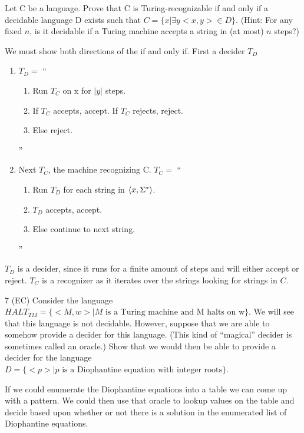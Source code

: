 \begin{problem}{6}
  Let C be a language. Prove that C is Turing-recognizable if and only if a decidable language D exists such that $C =
  \{x | \exists y <x,y> \in D\}$. (Hint: For any fixed $n$, is it decidable if a Turing machine accepts a string in (at
  most) $n$ steps?)
  \begin{solution}
    We must show both directions of the if and only if. First a decider $T_D$
    \begin{enumerate}
      \item $T_D =$ ``
        \begin{enumerate}
          \item Run $T_C$ on x for $|y|$ steps.
          \item If $T_C$ accepts, accept. If $T_C$ rejects, reject.
          \item Else reject.
        \end{enumerate}
      ''\\
      \item Next $T_C$, the machine recognizing C. $T_C =$ ``
        \begin{enumerate}
          \item Run $T_D$ for each string in $\left \langle x, \Sigma^* \right \rangle $.\\
          \item $T_D$ accepts, accept.\\
          \item Else continue to next string.\\
        \end{enumerate}
      ''
    \end{enumerate}
    $T_D$ is a decider, since it runs for a finite amount of steps and will either accept or reject. $T_C$ is a
    recognizer as it iterates over the strings looking for strings in $C$.
  \end{solution}
\end{problem}

\begin{problem}{7 (EC)}
  Consider the language $HALT_{TM} = \{<M,w> | M \text{ is a Turing machine and M halts on w} \}$. We will see that this
  language is not decidable. However, suppose that we are able to somehow provide a decider for this language. (This
  kind of ``magical'' decider is sometimes called an oracle.) Show that we would then be able to provide a decider for
  the language $D = \{<p> | p \text{ is a Diophantine equation with integer roots}\}$.
  \begin{solution}
    If we could enumerate the Diophantine equations into a table we can come up with a pattern.  We could then use that
    oracle to lookup values on the table and decide based upon whether or not there is a solution in the enumerated list
    of Diophantine equations.
  \end{solution}
\end{problem}



